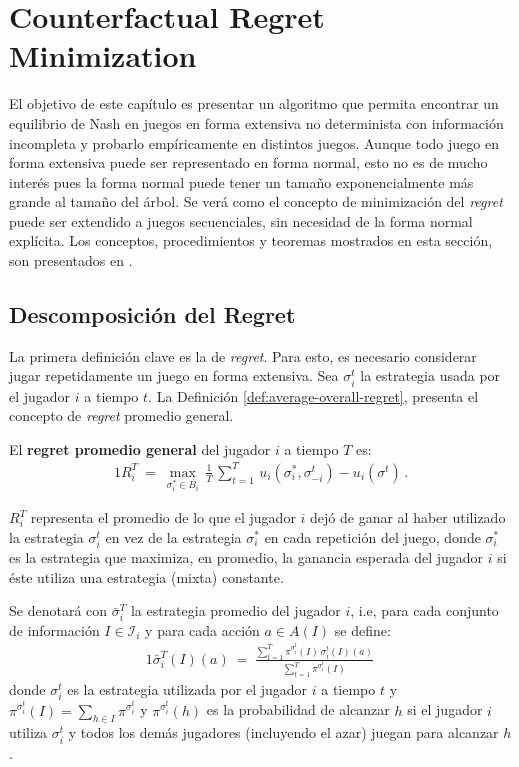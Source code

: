 \chapter{Counterfactual Regret Minimization}
\label{chapter:cfr}

El objetivo de este capítulo es presentar un algoritmo que permita encontrar un equilibrio de Nash en juegos en forma extensiva no determinista con información incompleta y probarlo empíricamente en distintos juegos. Aunque todo juego en forma extensiva puede ser representado en forma normal, esto no es de mucho interés pues la forma normal puede tener un tamaño exponencialmente más grande al tamaño del árbol. Se verá como el concepto de minimización del \textit{regret} puede ser extendido a juegos secuenciales, sin necesidad de la forma normal explícita. Los conceptos, procedimientos y teoremas mostrados en esta sección, son presentados en \cite{bib:cfr}.

\section{Descomposición del Regret}

La primera definición clave es la de \textit{regret}. Para esto, es necesario considerar jugar repetidamente un juego en forma extensiva. Sea $\sigma_i^t$ la estrategia usada por el jugador $i$ a tiempo $t$. La Definición \ref{def:average-overall-regret}, presenta el concepto de \textit{regret} promedio general.

\begin{definition}
\label{def:average-overall-regret}
El \textbf{regret promedio general} del jugador $i$ a tiempo $T$ es:
\begin{alignat}{1}
R_i^T\ =\ \max_{\sigma^*_i \in B_i} \, \frac{1}{T}\, \sum_{t = 1}^T \, u_i(\sigma_i^*, \sigma_{-i}^t) - u_i(\sigma^t) \,.
\end{alignat}
\end{definition}

$R_i^T$ representa el promedio de lo que el jugador $i$ dejó de ganar al haber utilizado la estrategia $\sigma^t_i$ en vez de la estrategia $\sigma^*_i$ en cada repetición del juego, donde $\sigma^*_i$ es la estrategia que maximiza, en promedio, la ganancia esperada del jugador $i$ si éste utiliza una estrategia (mixta) constante.

Se denotará con $\bar{\sigma}_i^{T}$ la estrategia promedio del jugador $i$, i.e, para cada conjunto de información $I \in \mathcal{I}_i$ y para cada acción $a \in A(I)$ se define:
\begin{alignat}{1}
\bar{\sigma}_i^{T}(I)(a)\ =\ \frac{\sum_{t = 1}^T \pi^{\sigma^t_i}(I)\,\sigma^t_i(I)(a)}{\sum_{t = 1}^T \pi^{\sigma_i^t}(I)} \,
\end{alignat}
donde $\sigma^t_i$ es la estrategia utilizada por el jugador $i$ a tiempo $t$ y $\pi^{\sigma_i^t}(I) = \sum_{h \in I} \pi^{\sigma_i^t}$ y $\pi^{\sigma_i^t}(h)$ es la probabilidad de alcanzar $h$ si el jugador $i$ utiliza $\sigma_i^t$ y todos los demás jugadores (incluyendo el azar) juegan para alcanzar $h$.

